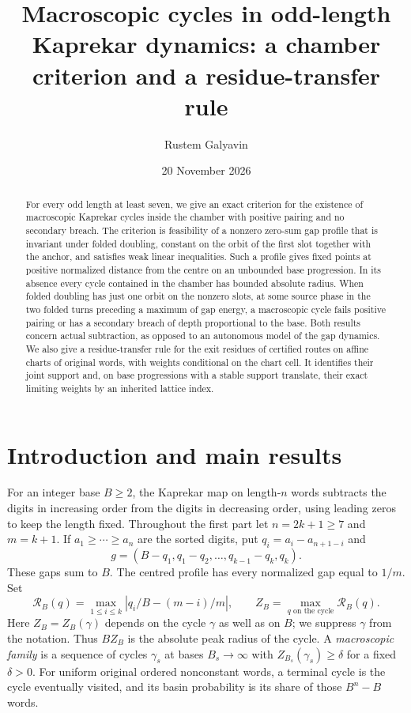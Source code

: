 \documentclass[11pt,reqno]{amsart}
\title[Macroscopic Kaprekar cycles]{Macroscopic cycles in odd-length Kaprekar dynamics: a chamber criterion and a residue-transfer rule}
\author{Rustem Galyavin}
\date{20 November 2026}
\theoremstyle{definition}
\begin{document}
\raggedbottom
\begin{abstract}
For every odd length at least seven, we give an exact criterion for the existence of macroscopic Kaprekar cycles inside the chamber with positive pairing and no secondary breach. The criterion is feasibility of a nonzero zero-sum gap profile that is invariant under folded doubling, constant on the orbit of the first slot together with the anchor, and satisfies weak linear inequalities. Such a profile gives fixed points at positive normalized distance from the centre on an unbounded base progression. In its absence every cycle contained in the chamber has bounded absolute radius. When folded doubling has just one orbit on the nonzero slots, at some source phase in the two folded turns preceding a maximum of gap energy, a macroscopic cycle fails positive pairing or has a secondary breach of depth proportional to the base. Both results concern actual subtraction, as opposed to an autonomous model of the gap dynamics. We also give a residue-transfer rule for the exit residues of certified routes on affine charts of original words, with weights conditional on the chart cell. It identifies their joint support and, on base progressions with a stable support translate, their exact limiting weights by an inherited lattice index.
\end{abstract}
\maketitle

\section{Introduction and main results}
For an integer base \(B\ge2\), the Kaprekar map on length-\(n\) words subtracts the digits in increasing order from the digits in decreasing order, using leading zeros to keep the length fixed. Throughout the first part let \(n=2k+1\ge7\) and \(m=k+1\). If \(a_1\ge\cdots\ge a_n\) are the sorted digits, put \(q_i=a_i-a_{n+1-i}\) and
\[
 g=(B-q_1,q_1-q_2,\ldots,q_{k-1}-q_k,q_k).
\]
These gaps sum to \(B\). The centred profile has every normalized gap equal to \(1/m\). Set
\[
 \mathcal R_B(q)=\max_{1\le i\le k}\left|q_i/B-(m-i)/m\right|,
 \qquad Z_B=\max_{q\text{ on the cycle}}\mathcal R_B(q).
\]
Here \(Z_B=Z_B(\gamma)\) depends on the cycle \(\gamma\) as well as on \(B\); we suppress \(\gamma\) from the notation. Thus \(BZ_B\) is the absolute peak radius of the cycle. A \emph{macroscopic family} is a sequence of cycles \(\gamma_s\) at bases \(B_s\to\infty\) with \(Z_{B_s}(\gamma_s)\ge\delta\) for a fixed \(\delta>0\). For uniform original ordered nonconstant words, a terminal cycle is the cycle eventually visited, and its basin probability is its share of those \(B^n-B\) words.
\end{document}
